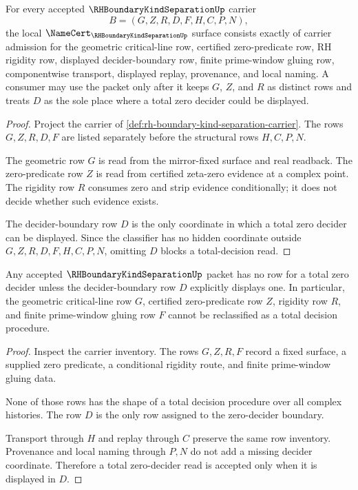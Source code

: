 \begin{theorem}\label{thm:rh-boundary-kind-separation-namecert-obligations}
For every accepted $\RHBoundaryKindSeparationUp$ carrier
$$
B=(G,Z,R,D,F,H,C,P,N),
$$
the local $\NameCert_{\RHBoundaryKindSeparationUp}$ surface consists exactly of carrier admission for the geometric critical-line row, certified zero-predicate row, RH rigidity row, displayed decider-boundary row, finite prime-window gluing row, componentwise transport, displayed replay, provenance, and local naming. A consumer may use the packet only after it keeps $G$, $Z$, and $R$ as distinct rows and treats $D$ as the sole place where a total zero decider could be displayed.
\end{theorem}
\begin{proof}
Project the carrier of \autoref{def:rh-boundary-kind-separation-carrier}. The rows $G,Z,R,D,F$ are listed separately before the structural rows $H,C,P,N$.

The geometric row $G$ is read from the mirror-fixed surface and real readback. The zero-predicate row $Z$ is read from certified zeta-zero evidence at a complex point. The rigidity row $R$ consumes zero and strip evidence conditionally; it does not decide whether such evidence exists.

The decider-boundary row $D$ is the only coordinate in which a total zero decider can be displayed. Since the classifier has no hidden coordinate outside $G,Z,R,D,F,H,C,P,N$, omitting $D$ blocks a total-decision read.
\end{proof}

\begin{theorem}\label{thm:rh-boundary-kind-separation-decider-nonescape}
Any accepted $\RHBoundaryKindSeparationUp$ packet has no row for a total zero decider unless the decider-boundary row $D$ explicitly displays one. In particular, the geometric critical-line row $G$, certified zero-predicate row $Z$, rigidity row $R$, and finite prime-window gluing row $F$ cannot be reclassified as a total decision procedure.
\end{theorem}
\begin{proof}
Inspect the carrier inventory. The rows $G,Z,R,F$ record a fixed surface, a supplied zero predicate, a conditional rigidity route, and finite prime-window gluing data.

None of those rows has the shape of a total decision procedure over all complex histories. The row $D$ is the only row assigned to the zero-decider boundary.

Transport through $H$ and replay through $C$ preserve the same row inventory. Provenance and local naming through $P,N$ do not add a missing decider coordinate. Therefore a total zero-decider read is accepted only when it is displayed in $D$.
\end{proof}


